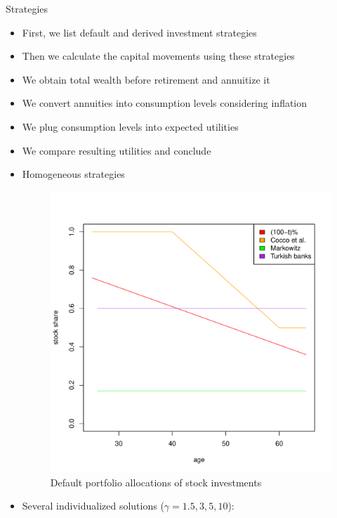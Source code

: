 \documentclass{beamer}
\begin{document}
\begin{frame}[allowframebreaks]{Strategies}
  \begin{itemize}
	\item First, we list default and derived investment strategies
	\item Then we calculate the capital movements using these strategies
	\item We obtain total wealth before retirement and annuitize it
	\item We convert annuities into consumption levels considering inflation
	\item We plug consumption levels into expected utilities
	\item We compare resulting utilities and conclude

\framebreak

	\item Homogeneous strategies

\begin{figure}[h]
	\centering
	\includegraphics[scale=0.25]{figs/defaults.pdf}
	\caption{Default portfolio allocations of stock investments}
\end{figure}
		

\framebreak


	\item Several individualized solutions ($\gamma=1.5,3,5,10$):


\end{itemize}
\end{frame}
\end{document}
